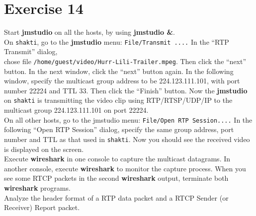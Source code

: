 \documentclass[10pt,a4paper]{article}
\numberwithin{equation}{section}
\numberwithin{figure}{section}
\numberwithin{table}{section}
\begin{document}
    \section{ Exercise 14}
    Start \textbf{jmstudio} on all the hosts, by using \textbf{jmstudio \&}. \\
    On \texttt{shakti}, go to the \textbf{jmstudio} menu: \texttt{File/Transmit ....} In the “RTP Transmit” dialog, \\ chose file \texttt{/home/guest/video/Hurr-Lili-Trailer.mpeg}.
    Then click the “next” button.
    In the next window, click the “next” button again.
    In the following window, specify the multicast group address to be 224.123.111.101, with port number 22224 and TTL 33.
    Then click the “Finish” button.
    Now the \textbf{jmstudio} on \texttt{shakti} is transmitting the video clip using RTP/RTSP/UDP/IP to the multicast group 224.123.111.101 on port 22224. \\
    On all other hosts, go to the jmstudio menu: \texttt{File/Open RTP Session....} In the following “Open RTP Session” dialog, specify the same group address, port number and TTL as that used in \texttt{shakti}.
    Now you should see the received video is displayed on the screen. \\
    Execute \textbf{wireshark} in one console to capture the multicast datagrams.
    In another console, execute \textbf{wireshark} to monitor the capture process.
    When you see some RTCP packets in the second \textbf{wireshark} output, terminate both \textbf{wireshark} programs. \\
    Analyze the header format of a RTP data packet and a RTCP Sender (or Receiver) Report packet.
\end{document}
